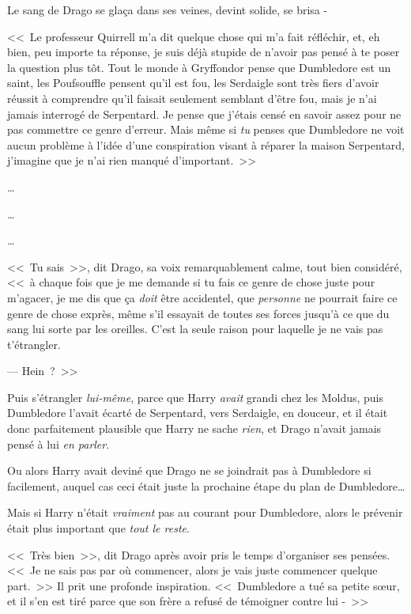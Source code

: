 Le sang de Drago se glaça dans ses veines, devint solide, se brisa -

<<~Le professeur Quirrell m'a dit quelque chose qui m'a fait réfléchir, et, eh bien, peu importe ta réponse, je suis déjà stupide de n'avoir pas pensé à te poser la question plus tôt. Tout le monde à Gryffondor pense que Dumbledore est un saint, les Poufsouffle pensent qu'il est fou, les Serdaigle sont très fiers d'avoir réussit à comprendre qu'il faisait seulement semblant d'être fou, mais je n'ai jamais interrogé de Serpentard. Je pense que j'étais censé en savoir assez pour ne pas commettre ce genre d'erreur. Mais même si \emph{tu} penses que Dumbledore ne voit aucun problème à l'idée d'une conspiration visant à réparer la maison Serpentard, j'imagine que je n'ai rien manqué d'important.~>>

…

…

…

<<~Tu sais~>>, dit Drago, sa voix remarquablement calme, tout bien considéré, <<~à chaque fois que je me demande si tu fais ce genre de chose juste pour m'agacer, je me dis que ça \emph{doit} être accidentel, que \emph{personne} ne pourrait faire ce genre de chose exprès, même s'il essayait de toutes ses forces jusqu'à ce que du sang lui sorte par les oreilles. C'est la seule raison pour laquelle je ne vais pas t'étrangler.

--- Hein~?~>>

Puis s'étrangler \emph{lui-même}, parce que Harry \emph{avait} grandi chez les Moldus, puis Dumbledore l'avait écarté de Serpentard, vers Serdaigle, en douceur, et il était donc parfaitement plausible que Harry ne sache \emph{rien}, et Drago n'avait jamais pensé à lui \emph{en parler}.

Ou alors Harry avait deviné que Drago ne se joindrait pas à Dumbledore si facilement, auquel cas ceci était juste la prochaine étape du plan de Dumbledore…

Mais si Harry n'était \emph{vraiment} pas au courant pour Dumbledore, alors le prévenir était plus important que \emph{tout le reste}.

<<~Très bien~>>, dit Drago après avoir pris le temps d'organiser ses pensées. <<~Je ne sais pas par où commencer, alors je vais juste commencer quelque part.~>> Il prit une profonde inspiration. <<~Dumbledore a tué sa petite sœur, et il s'en est tiré parce que son frère a refusé de témoigner contre lui -~>>

\later

